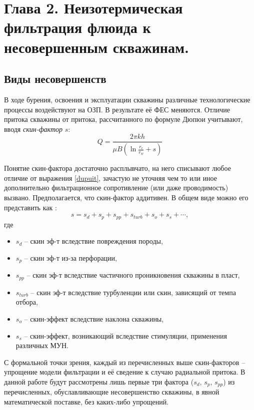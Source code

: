 \section*{Глава 2. Неизотермическая фильтрация флюида к несовершенным скважинам.}

\setcounter{section}{2}
\setcounter{subsection}{0}
\setcounter{equation}{0}


\subsection{Виды несовершенств}
	В ходе бурения, освоения и эксплуатации скважины различные технологические процессы воздействуют на ОЗП.
	В результате её ФЕС меняются.
	Отличие притока скважины от притока, рассчитанного по формуле Дюпюи учитывают, вводя \textit{скин-фактор} $s$:
\begin{equation}
	\label{dupuit}
	Q = \frac{2\pi k h}{\mu B \left(\ln\displaystyle\frac{r_e}{r_w}+s\right)}
\end{equation}

	Понятие скин-фактора достаточно расплывчато, на него списывают любое отличие от выражения \eqref{dupuit}, зачастую не уточняя чем то или иное дополнительно фильтрационное сопротивление (или даже проводимость) вызвано. Предполагается, что скин-фактор аддитивен. В общем виде можно его представить как \cite{mukerdzhi}:
\begin{equation}
	\label{skin_full}
	s = s_d + s_p + s_{pp} + s_{turb} + s_o + s_s + \cdots,
\end{equation}
	где
\begin{itemize}
\item $s_d$ -- скин эф-т вследствие повреждения породы,
\item $s_p$ -- скин эф-т из-за перфорации,
\item $s_{pp}$ -- скин эф-т вследствие частичного проникновения скважины в пласт,
\item $s_{turb}$ -- скин эф-т вследствие турбуленции или скин, зависящий от темпа отбора,
\item $s_{o}$ -- скин-эффект вследствие наклона скважины,
\item $s_{s}$ -- скин-эффект, возникающий вследствие стимуляции, применения различных МУН.
\end{itemize}
	С формальной точки зрения, каждый из перечисленных выше скин-факторов -- упрощение модели фильтрации и её сведение к случаю радиальной притока. В данной работе будут рассмотрены лишь первые три фактора ($s_d$, $s_p$, $s_{pp}$) из перечисленных, обуславливающие несовершенство скважины, в явной математической поставке, без каких-либо упрощений.

